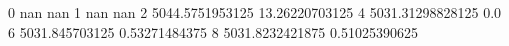 0 nan nan
1 nan nan
2 5044.5751953125 13.26220703125
4 5031.31298828125 0.0
6 5031.845703125 0.53271484375
8 5031.8232421875 0.51025390625
